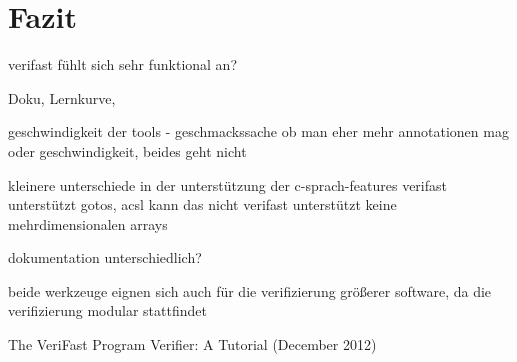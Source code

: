 ﻿\chapter{Fazit}

verifast fühlt sich sehr funktional an?

Doku, Lernkurve, 

geschwindigkeit der tools - geschmackssache ob man eher mehr annotationen mag oder geschwindigkeit, beides geht nicht


kleinere unterschiede in der unterstützung der c-sprach-features
	verifast unterstützt gotos, acsl kann das nicht
	verifast unterstützt keine mehrdimensionalen arrays
	
dokumentation unterschiedlich?
	
beide werkzeuge eignen sich auch für die verifizierung größerer software, da die verifizierung modular stattfindet

\begin{thebibliography}{}
 The VeriFast Program Verifier: A Tutorial (December 2012)
\end{thebibliography}
